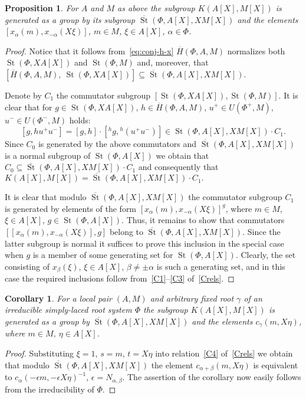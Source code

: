 \documentclass[oneside, 8pt]{amsart}
\newtheorem{prop}{Proposition}
\newtheorem{corollary}{Corollary}
\theoremstyle{remark}
\theoremstyle{definition}
\DeclareMathOperator{\St}{St}
\numberwithin{equation}{section}
\begin{document}
\begin{prop} \label{Kgen} For $A$ and $M$ as above the subgroup $K(A[X], M[X])$ is generated as a group by its subgroup $\overline{\St}(\Phi, A[X], XM[X])$ and
 the elements $[x_\alpha(m), x_{-\alpha}(X\xi)]$, $m \in M$, $\xi \in A[X]$, $\alpha \in \Phi$. \end{prop}
\begin{proof} Notice that it follows from~\eqref{eq:conj-h-x} $\overline{H}(\Phi, A, M)$ normalizes both $\St(\Phi, XA[X])$ and $\St(\Phi, M)$ and, moreover, that $[\overline{H}(\Phi, A, M),\ \St(\Phi, XA[X])] \subseteq \overline{\St}(\Phi, A[X], XM[X])$. 

Denote by $C_1$ the commutator subgroup $[\St(\Phi, XA[X]), \St(\Phi, M)]$.
It is clear that for $g \in \St(\Phi, XA[X])$, $h \in \overline{H}(\Phi, A, M)$, $u^+ \in U(\Phi^+, M)$, $u^- \in U(\Phi^-, M)$ holds:
\[ [g, h u^+ u^-] = [g, h] \cdot [{}^{h}\!g, {}^{h}\!(u^+u^-)] \in \St(\Phi, A[X], XM[X]) \cdot C_1.\]
Since $C_0$ is generated by the above commutators and $\overline{\St}(\Phi, A[X], XM[X])$ is a normal subgroup of $\St(\Phi, A[X])$
we obtain that $C_0 \subseteq \overline{\St}(\Phi, A[X], XM[X]) \cdot C_1$ and consequently that
$K(A[X], M[X]) = \overline{\St}(\Phi, A[X], XM[X]) \cdot C_1.$
 
It is clear that modulo $\overline{\St}(\Phi, A[X], XM[X])$ the commutator subgroup $C_1$ is generated by elements of the form $[x_\alpha(m), x_{-\alpha}(X\xi)]^g$, where $m \in M$, $\xi \in A[X]$, $g \in \St(\Phi, A[X])$.
Thus, it remains to show that commutators $[[x_\alpha(m), x_{-\alpha}(X\xi)], g]$ belong to $\overline{\St}(\Phi, A[X], XM[X])$.
Since the latter subgroup is normal it suffices to prove this inclusion in the special case when $g$ is a member of some generating set for $\St(\Phi, A[X])$.
Clearly, the set consisting of $x_\beta(\xi)$, $\xi \in A[X]$, $\beta \neq \pm \alpha$ is such a generating set, 
 and in this case the required inclusions follow from~\eqref{C1}--\eqref{C3} of~\cref{Crels}. \end{proof}

\begin{corollary} \label{Kgen-strong} For a local pair $(A, M)$ and arbitrary fixed root $\gamma$ of an irreducible simply-laced root system $\Phi$ the subgroup $K(A[X], M[X])$ is generated as a group by $\overline{\St}(\Phi, A[X], XM[X])$ and the elements $c_{\gamma}(m, X\eta)$, where $m \in M$, $\eta \in A[X]$. \end{corollary}
\begin{proof} Substituting $\xi = 1$, $s = m$, $t = X\eta$ into relation~\eqref{C4} of~\cref{Crels} we obtain that modulo 
 $\overline{\St}(\Phi, A[X], XM[X])$ the element $c_{\alpha + \beta}(m, X\eta)$ is equivalent to $c_{\alpha}(-\epsilon m, -\epsilon X \eta)^{-1}$, $\epsilon = N_{\alpha, \beta}$. The assertion of the corollary now easily follows from the irreducibility of $\Phi$.
\end{proof}
\end{document}
